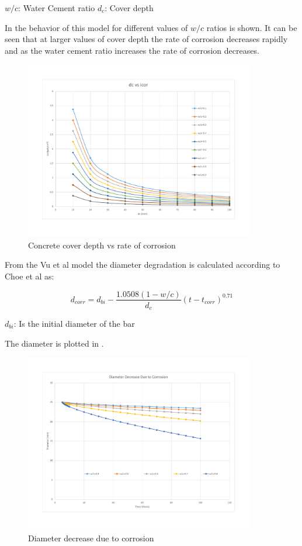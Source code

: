 $w/c$: Water Cement ratio
$d_c$: Cover depth

In  the behavior of this model for different values of $w/c$ ratios is shown. It can be seen that at larger values of cover depth the rate of corrosion decreases rapidly and as the water cement ratio increases the rate of corrosion decreases.
%
\begin{figure}[htbp]
\centering
\includegraphics[width=0.9\textwidth]{Chapter-4/figs/dcvsicor}
\caption{Concrete cover depth vs rate of corrosion}
\label{fig:hist1}
\end{figure}

From the Vu et al model the diameter degradation is calculated according to Choe et al as:

\begin{equation}
  d_{corr}=d_{bi}-\frac{1.0508(1-w/c)}{d_c} (t-t_{corr})^{0.71}
  \label{eq.nine}
\end{equation} 

$d_{bi}$: Is the initial diameter of the bar

The diameter is plotted in .

\begin{figure}[htbp]
\centering
\includegraphics[width=0.9\textwidth]{Chapter-4/figs/DiameterDecrease}
\caption{Diameter decrease due to corrosion}
\label{fig:hist2}
\end{figure}

